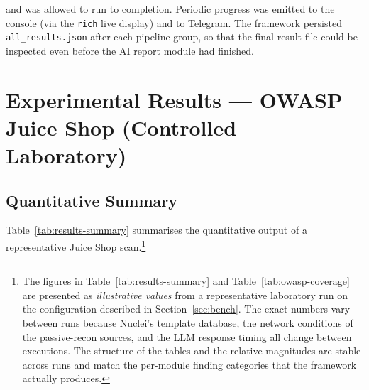 \noindent and was allowed to run to completion. Periodic progress was emitted to the console (via the \texttt{rich} live display) and to Telegram. The framework persisted \texttt{all\_results.json} after each pipeline group, so that the final result file could be inspected even before the AI report module had finished.

\section[Juice Shop Experimental Results]{Experimental Results --- OWASP Juice Shop (Controlled Laboratory)}

\subsection{Quantitative Summary}

Table~\ref{tab:results-summary} summarises the quantitative output of a representative Juice Shop scan.\footnote{The figures in Table~\ref{tab:results-summary} and Table~\ref{tab:owasp-coverage} are presented as \textit{illustrative values} from a representative laboratory run on the configuration described in Section~\ref{sec:bench}. The exact numbers vary between runs because Nuclei's template database, the network conditions of the passive-recon sources, and the LLM response timing all change between executions. The structure of the tables and the relative magnitudes are stable across runs and match the per-module finding categories that the framework actually produces.}

